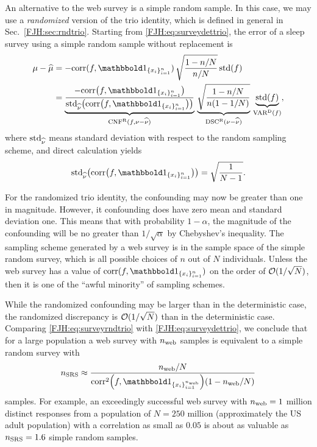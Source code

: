 \documentclass[graybox,footinfo]{svmult}
\DeclareMathOperator{\algn}{CNF}
\DeclareMathOperator{\disc}{DSC}
\DeclareMathOperator{\Var}{VAR}
\begin{document}
An alternative to the web survey is a simple random sample.  In this 
case, we may use a 
\emph{randomized} version of the trio identity, which is defined in general in Sec.\  
\ref{FJH:sec:rndtrio}.  Starting 
from \eqref{FJH:eq:surveydettrio}, the 
error of a sleep survey using a simple random sample without replacement is
\begin{align}
\nonumber
\mu - \widehat{\mu} 
& = -\corr(f, \bbone_{\{x_i\}_{i=1}^n}) \,
\sqrt{\frac{1 - n/N}{n/N}} \, 
\std(f) \\
& = \underbrace{\frac{- \corr\bigl(f, \bbone_{\{x_i\}_{i=1}^n}\bigr)}
{\std_{\hnu} \bigl( \corr\bigl(f, \bbone_{\{x_i\}_{i=1}^n}\bigr)\bigr)}}_{\algn^\Rn(f,\nu - \hnu)} 
\, 
\underbrace{\sqrt{\frac{1-n/N}{n(1-1/N)}}}_{\disc^\Rn(\nu - \hnu)} \, 
\underbrace{\std(f)}_{\Var^\Dt(f)},
\label{FJH:eq:surveyrndtrio}
\end{align}
where $\textup{std}_{\widehat{\nu}}$ means standard deviation with respect to the random sampling 
scheme, and direct calculation yields
\begin{equation*}
\std_{\hnu} \bigl( \corr\bigl(f, \bbone_{\{x_i\}_{i=1}^n}\bigr)\bigr) = \sqrt{\frac{1}{N-1}}.
\end{equation*}

For the randomized trio identity, the confounding may now be greater than one in 
magnitude.  However, it confounding does have zero mean and 
standard deviation one.  This means that with probability $1-\alpha$, the magnitude of 
the confounding will be no greater than $1/\sqrt{\alpha}$ by Chebyshev's inequality. The 
sampling scheme generated by a web survey is in the sample space of the simple 
random survey, which is all possible choices of $n$ out of $N$ individuals.  Unless the 
web survey has a value of $\corr(f, \bbone_{\{x_i\}_{i=1}^n})$ 
on the order of $\mathcal{O}(1/\sqrt{N})$, then it is one of the ``awful minority'' of 
sampling schemes.

While the randomized confounding may be larger than in the deterministic case, 
the randomized discrepancy is $\mathcal{O}(1/\sqrt{N})$ than in the 
deterministic case.  Comparing \eqref{FJH:eq:surveyrndtrio} with 
\eqref{FJH:eq:surveydettrio}, we conclude that for a large population a web survey with 
$n_{\textup{web}}$ samples is equivalent to a simple random survey with 
\[
n_{\textup{SRS}} \approx \frac{n_{\textup{web}}/N}{\corr^2\Bigl(f, 
\bbone_{\{x_i\}_{i=1}^{n_{\textup{web}}}}\Bigr)(1-n_{\textup{web}}/N)}
\]
samples.  For example, an exceedingly successful web survey with $n_{\textup{web}} = 
1$ million distinct responses from a population of $N = 250$ million 
(approximately the US adult population) with a correlation as small as $0.05$ is about as 
valuable as $n_{\textup{SRS}} = 1.6$ simple random samples.
\end{document}
